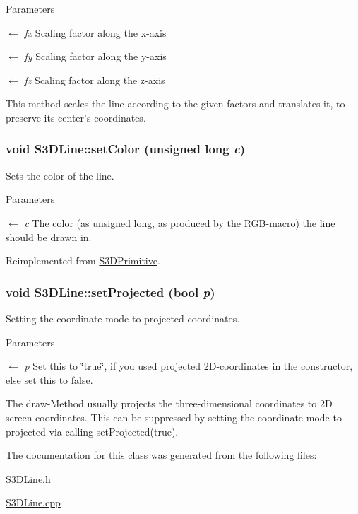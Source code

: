 \begin{DoxyParams}{Parameters}
\item[\mbox{$\leftarrow$} {\em fx}]Scaling factor along the x-\/axis \item[\mbox{$\leftarrow$} {\em fy}]Scaling factor along the y-\/axis \item[\mbox{$\leftarrow$} {\em fz}]Scaling factor along the z-\/axis\end{DoxyParams}
This method scales the line according to the given factors and translates it, to preserve its center's coordinates. \hypertarget{class_s3_d_line_a9feaf056477e858a7b0248a7b5cdd222}{
\subsubsection[{setColor}]{\setlength{\rightskip}{0pt plus 5cm}void S3DLine::setColor (unsigned long {\em c})}}
\label{class_s3_d_line_a9feaf056477e858a7b0248a7b5cdd222}


Sets the color of the line. 


\begin{DoxyParams}{Parameters}
\item[\mbox{$\leftarrow$} {\em c}]The color (as unsigned long, as produced by the RGB-\/macro) the line should be drawn in. \end{DoxyParams}


Reimplemented from \hyperlink{class_s3_d_primitive_a1c8f036193987522bdfb6a49b9b74000}{S3DPrimitive}.

\hypertarget{class_s3_d_line_a3b973e5206d4bed73b797b4c5afe8dec}{
\subsubsection[{setProjected}]{\setlength{\rightskip}{0pt plus 5cm}void S3DLine::setProjected (bool {\em p})}}
\label{class_s3_d_line_a3b973e5206d4bed73b797b4c5afe8dec}


Setting the coordinate mode to projected coordinates. 


\begin{DoxyParams}{Parameters}
\item[\mbox{$\leftarrow$} {\em p}]Set this to \char`\"{}true\char`\"{}, if you used projected 2D-\/coordinates in the constructor, else set this to false.\end{DoxyParams}
The draw-\/Method usually projects the three-\/dimensional coordinates to 2D screen-\/coordinates. This can be suppressed by setting the coordinate mode to projected via calling setProjected(true). 

The documentation for this class was generated from the following files:\begin{DoxyCompactItemize}
\item 
\hyperlink{_s3_d_line_8h}{S3DLine.h}\item 
\hyperlink{_s3_d_line_8cpp}{S3DLine.cpp}\end{DoxyCompactItemize}
